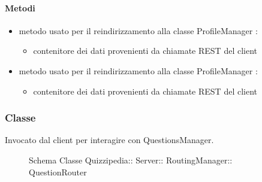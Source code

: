 \paragraph{Metodi}
\begin{itemize}
\item {}
\newline
metodo usato per il reindirizzamento alla classe ProfileManager
\newline
{} :
\begin{itemize}
\item {}
\newline
contenitore dei dati provenienti da chiamate REST del client
\end{itemize}
\item {}
\newline
metodo usato per il reindirizzamento alla classe ProfileManager
\newline
{} :
\begin{itemize}
\item {}
\newline
contenitore dei dati provenienti da chiamate REST del client
\end{itemize}
\end{itemize}
\subsubsection{Classe }
Invocato dal client per interagire con QuestionsManager.
\begin{figure}[H]
\centering
\noindent{}
\caption[Schema Classe QuestionRouter]{Schema Classe Quizzipedia:: Server:: RoutingManager:: QuestionRouter}
\end{figure}
